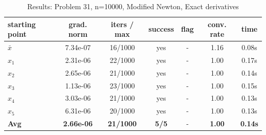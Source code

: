 \begin{longtable}{|l|c|c|c|c|c|c|}
\caption{Results: Problem 31, n=10000, Modified Newton, Exact derivatives} \\
\hline
\textbf{starting point} & \textbf{grad. norm} & \textbf{iters / max} & \textbf{success} & \textbf{flag} & \textbf{conv. rate} & \textbf{time} \\
\hline
\endfirsthead
\endhead
\endfoot
\hline
\endlastfoot
$\bar{x}$ & 7.34e-07 & 16/1000 & yes & - & 1.16 & 0.08s \\
\hline
$x_1$ & 2.31e-06 & 22/1000 & yes & - & 1.00 & 0.17s \\
\hline
$x_2$ & 2.65e-06 & 21/1000 & yes & - & 1.00 & 0.14s \\
\hline
$x_3$ & 1.13e-06 & 23/1000 & yes & - & 1.00 & 0.15s \\
\hline
$x_4$ & 3.03e-06 & 21/1000 & yes & - & 1.00 & 0.13s \\
\hline
$x_5$ & 6.31e-06 & 20/1000 & yes & - & 1.00 & 0.13s \\
\hline
\hline\hline
\textbf{Avg} & \textbf{2.66e-06} & \textbf{21/1000} & \textbf{5/5} & - & \textbf{1.00} & \textbf{0.14s} \\
\hline\hline
\end{longtable}


